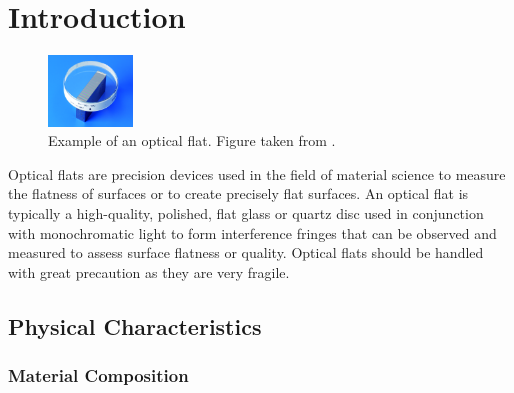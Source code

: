 \documentclass[../main.tex]{subfiles}
\begin{document}
\chapter{Introduction}

\vspace{-5pt}

\begin{minipage}{\textwidth}
\begin{figure}
    \vspace{\dimexpr0.3\baselineskip-\topskip}%
    \noindent
    \centering
    \includegraphics[width=0.2\textwidth]{Images/Introduction/optical_flat}
    \vspace{-8pt}
    \caption{Example of an optical flat. Figure taken from \cite{optical_flat_mitutoyo}.}
    \label{fig:optical_flat_example}
\end{figure}
Optical flats are precision devices used in the field of material science to measure the flatness of surfaces or to create precisely flat surfaces. An optical flat is typically a high-quality, polished, flat glass or quartz disc used in conjunction with monochromatic light to form interference fringes that can be observed and measured to assess surface flatness or quality. Optical flats should be handled with great precaution as they are very fragile. \cite{Toru_2017, edmund_optics_optical_flats, kemet_optical_flats, lapmaster_wolters_optical_flats,Paschottaoptical_flats}
\end{minipage}

\vspace{-10pt}

\section{Physical Characteristics}

\vspace{-15pt}

\subsection{Material Composition}
\end{document}

